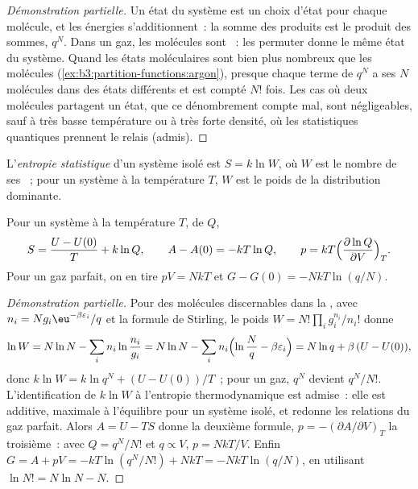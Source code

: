 \begin{proof}[Démonstration partielle]
Un état du système est un choix d'état pour chaque molécule, et les
énergies s'additionnent~: la somme des produits est le produit des
sommes, $q^N$. Dans un gaz, les molécules sont ~: les
permuter donne le même état du système. Quand les états moléculaires
sont bien plus nombreux que les molécules
(\cref{ex:b3:partition-functions:argon}), presque chaque terme de $q^N$
a ses $N$ molécules dans des états différents et est compté $N!$ fois.
Les cas où deux molécules partagent un état, que ce dénombrement compte
mal, sont négligeables, sauf à très basse température ou à très forte
densité, où les statistiques quantiques prennent le relais (admis).
\end{proof}

\begin{definition}\label{def:b3:partition-functions:statistical-entropy}
L'\emph{entropie statistique} d'un système
isolé est
$S = k\ln W$, où $W$ est le nombre de ses ~; pour un système
à la température $T$, $W$ est le poids de la distribution dominante.
\end{definition}

\begin{theorem}\label{thm:b3:partition-functions:entropy}
Pour un système à la température $T$, de  $Q$,
\[
  S = \frac{U - U(0)}{T} + k\ln Q, \qquad A - A(0) = -kT\ln Q, \qquad
  p = kT\Bigl(\frac{\partial\ln Q}{\partial V}\Bigr)_T .
\]
Pour un gaz parfait, on en tire $pV = NkT$ et $G - G(0) = -NkT\ln(q/N)$.
\end{theorem}

\begin{proof}[Démonstration partielle]
Pour des molécules discernables dans la , avec
$n_i = Ng_i\eu^{-\beta\varepsilon_i}/q$
et la formule de Stirling, le poids $W = N!\prod_ig_i^{n_i}/n_i!$ donne
\[
  \ln W = N\ln N - \sum_in_i\ln\frac{n_i}{g_i} = N\ln N - \sum_in_i\Bigl(\ln\frac Nq - \beta\varepsilon_i\Bigr)
        = N\ln q + \beta\,(U - U(0)),
\]
donc $k\ln W = k\ln q^N + (U - U(0))/T$~; pour un gaz, $q^N$ devient
$q^N/N!$. L'identification de $k\ln W$ à l'entropie thermodynamique est
admise~: elle est additive, maximale à l'équilibre pour un système
isolé, et redonne les relations du gaz parfait. Alors $A = U - TS$
donne la deuxième formule, $p =
-(\partial A/\partial V)_T$ la troisième~: avec $Q = q^N/N!$ et $q \propto V$, $p = NkT/V$. Enfin
$G = A + pV = -kT\ln(q^N/N!) + NkT = -NkT\ln(q/N)$, en utilisant $\ln N! = N\ln N - N$.
\end{proof}

